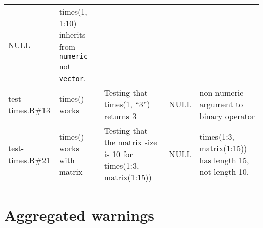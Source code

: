 \documentclass[
]{book}
\begin{document}
\begin{longtable}[]{@{}lllll@{}}
\begin{minipage}[t]{0.04\columnwidth}
NULL\strut
\end{minipage} & \begin{minipage}[t]{0.43\columnwidth}\raggedright
times(1, 1:10) inherits from \texttt{numeric} not \texttt{vector}.\strut
\end{minipage}\tabularnewline
\begin{minipage}[t]{0.07\columnwidth}\raggedright
test-times.R\#13\strut
\end{minipage} & \begin{minipage}[t]{0.11\columnwidth}\raggedright
times() works\strut
\end{minipage} & \begin{minipage}[t]{0.21\columnwidth}\raggedright
Testing that times(1, ``3'') returns 3\strut
\end{minipage} & \begin{minipage}[t]{0.04\columnwidth}\raggedright
NULL\strut
\end{minipage} & \begin{minipage}[t]{0.43\columnwidth}\raggedright
non-numeric argument to binary operator\strut
\end{minipage}\tabularnewline
\begin{minipage}[t]{0.07\columnwidth}\raggedright
test-times.R\#21\strut
\end{minipage} & \begin{minipage}[t]{0.11\columnwidth}\raggedright
times() works with matrix\strut
\end{minipage} & \begin{minipage}[t]{0.21\columnwidth}\raggedright
Testing that the matrix size is 10 for times(1:3, matrix(1:15))\strut
\end{minipage} & \begin{minipage}[t]{0.04\columnwidth}\raggedright
NULL\strut
\end{minipage} & \begin{minipage}[t]{0.43\columnwidth}\raggedright
times(1:3, matrix(1:15)) has length 15, not length 10.\strut
\end{minipage}\tabularnewline
\bottomrule
\end{longtable}

\hypertarget{aggregated-warnings}{%
\chapter{Aggregated warnings}\label{aggregated-warnings}}
\end{document}
